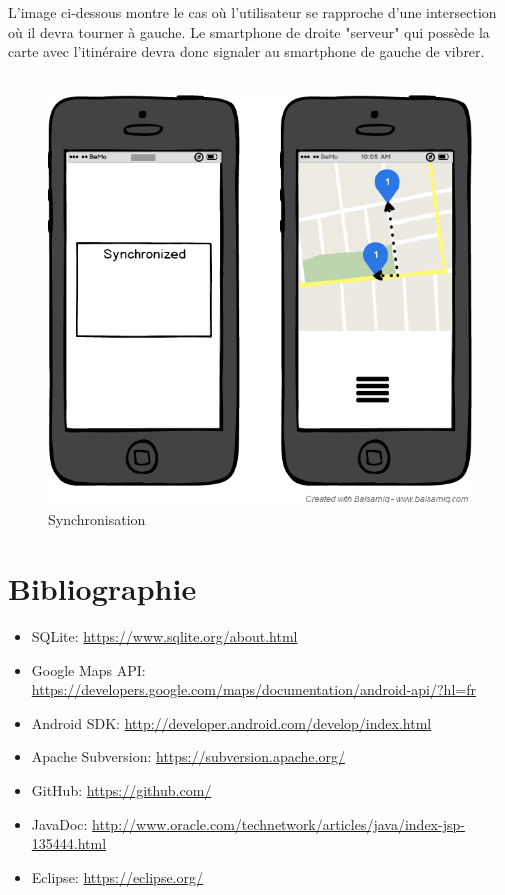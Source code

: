 \documentclass[12pt]{report}
\begin{document}
\newpage
L'image ci-dessous montre le cas où l'utilisateur se rapproche d'une intersection où il devra tourner à gauche. Le smartphone de droite "serveur" qui possède la carte avec l'itinéraire devra donc signaler au smartphone de gauche de vibrer.\\\\
\begin{figure}[h]
\begin{center}
\includegraphics[scale=0.5]{Cas.png}
\caption{Synchronisation}
\end{center}
\end{figure}

\chapter*{Bibliographie}
\begin{itemize}
\item SQLite: \url{https://www.sqlite.org/about.html}
\item Google Maps API:\\ \url{https://developers.google.com/maps/documentation/android-api/?hl=fr}
\item Android SDK: \url{http://developer.android.com/develop/index.html}
\item Apache Subversion: \url{https://subversion.apache.org/}
\item GitHub: \url{https://github.com/}
\item JavaDoc: \url{http://www.oracle.com/technetwork/articles/java/index-jsp-135444.html}
\item Eclipse: \url{https://eclipse.org/}
\end{itemize}
\end{document}
